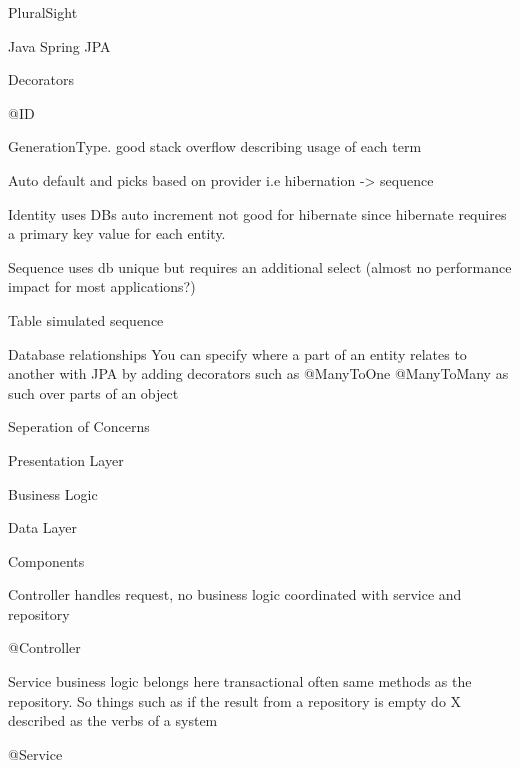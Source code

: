\documentclass[presentation]{beamer}
\begin{document}
\begin{frame}[label={sec:org34d6546}]{PluralSight}
\begin{block}{Java Spring JPA}
\begin{block}{Decorators}
\begin{block}{@ID}
\begin{block}{GenerationType.}
good stack overflow describing usage of each term
\begin{block}{Auto}
default and picks based on provider i.e hibernation -> sequence
\end{block}
\begin{block}{Identity}
uses DBs auto increment not good for hibernate since hibernate requires a primary key value for each entity.
\end{block}
\begin{block}{Sequence}
uses db unique but requires an additional select (almost no performance impact for most applications?)
\end{block}
\begin{block}{Table}
simulated sequence
\end{block}
\end{block}
\begin{block}{Database relationships}
You can specify where a part of an entity relates to another with JPA by adding decorators such as @ManyToOne @ManyToMany as such over parts of an object
\end{block}
\end{block}
\end{block}
\begin{block}{Seperation of Concerns}
\begin{block}{Presentation Layer}
\end{block}
\begin{block}{Business Logic}
\end{block}
\begin{block}{Data Layer}
\end{block}
\end{block}
\begin{block}{Components}
\begin{block}{Controller}
handles request, no business logic
coordinated with service and repository
\begin{block}{@Controller}
\end{block}
\end{block}
\begin{block}{Service}
business logic belongs here
transactional
often same methods as the repository. So things such as if the result from a repository is empty do X
described as the verbs of a system
\begin{block}{@Service}
\end{block}
\end{block}


\end{block}
\end{block}
\end{frame}
\end{document}
